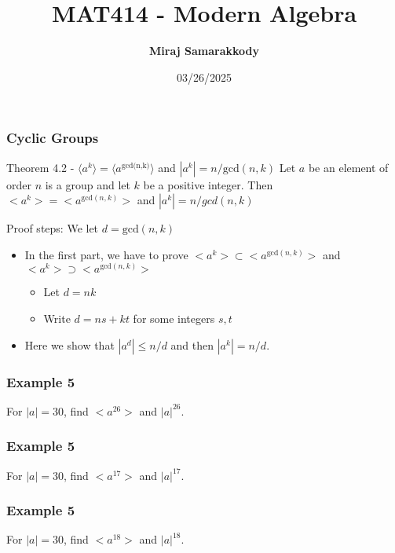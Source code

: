 \documentclass{beamer}
\title{MAT414 - Modern Algebra}
\author{\textbf{Miraj Samarakkody}}
\institute{Tougaloo College}
\date{03/26/2025}
\begin{document}
\begin{frame}
    \titlepage
\end{frame}

\begin{frame}
    \frametitle{Cyclic Groups}

    \begin{block}{Theorem 4.2 - \(\langle a^k \rangle= \langle a^{\text{gcd(n,k)}}\rangle\) and \(|a^k|=n/ \text{gcd}(n,k)\)}
        Let \(a\) be an element of order \(n\) is a group and let \(k\) be a positive integer. Then \(<a^k>=<a^{\text{gcd}(n,k)}>\) and \(|a^k|=n/gcd(n,k)\)
    \end{block}\pause 
    \begin{block}{Proof steps:}
        We let \(d=\text{gcd}(n,k)\)
        \begin{itemize}
            \item In the first part, we have to prove \(<a^k> \subset <a^{\text{gcd}(n,k)}>\) and \(<a^k>\supset <a^{\text{gcd}(n,k)}>\)\pause
            \begin{itemize}
                \item Let \(d=nk\)\pause
                \item Write \(d=ns+kt\) for some integers \(s,t \)\pause
            \end{itemize} 
            \item Here we show that \(|a^d|\leq n/d\) and then \(|a^k| =n/d\). 
        \end{itemize}
        
    \end{block}
\end{frame}

    \begin{frame}
        \frametitle{Example 5}
    For \(|a|=30\), find \(< a^{26} >\) and \(|a|^{26}\).
        
    
    \end{frame}

    
    \begin{frame}
        \frametitle{Example 5}
    For \(|a|=30\), find \(< a^{17} >\) and \(|a|^{17}\).
        
    
    \end{frame}

    \begin{frame}
        \frametitle{Example 5}
    For \(|a|=30\), find \(< a^{18} >\) and \(|a|^{18}\).
        
    
    \end{frame}
\end{document}
